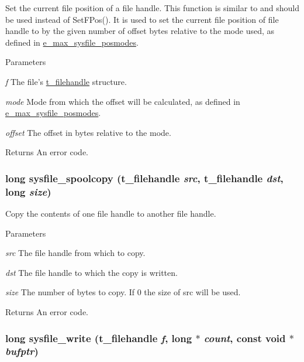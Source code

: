 Set the current file position of a file handle. This function is similar to and should be used instead of SetFPos(). It is used to set the current file position of file handle to by the given number of offset bytes relative to the mode used, as defined in \hyperlink{group__files_gaf61f48b912d9a2942d962ab5e61688fd}{e\_\-max\_\-sysfile\_\-posmodes}.


\begin{DoxyParams}{Parameters}
\item[{\em f}]The file's \hyperlink{group__files_gafcb776aa74d514754e83b30995b5a5d1}{t\_\-filehandle} structure. \item[{\em mode}]Mode from which the offset will be calculated, as defined in \hyperlink{group__files_gaf61f48b912d9a2942d962ab5e61688fd}{e\_\-max\_\-sysfile\_\-posmodes}. \item[{\em offset}]The offset in bytes relative to the mode. \end{DoxyParams}
\begin{DoxyReturn}{Returns}
An error code. 
\end{DoxyReturn}
\hypertarget{group__files_ga711ee8ebe5363e23e01d3ffeef67373e}{
\subsubsection[{sysfile\_\-spoolcopy}]{\setlength{\rightskip}{0pt plus 5cm}long sysfile\_\-spoolcopy ({\bf t\_\-filehandle} {\em src}, \/  {\bf t\_\-filehandle} {\em dst}, \/  long {\em size})}}
\label{group__files_ga711ee8ebe5363e23e01d3ffeef67373e}


Copy the contents of one file handle to another file handle. 
\begin{DoxyParams}{Parameters}
\item[{\em src}]The file handle from which to copy. \item[{\em dst}]The file handle to which the copy is written. \item[{\em size}]The number of bytes to copy. If 0 the size of src will be used. \end{DoxyParams}
\begin{DoxyReturn}{Returns}
An error code. 
\end{DoxyReturn}
\hypertarget{group__files_ga8272d55e223bfd31e96db15f73be8805}{
\subsubsection[{sysfile\_\-write}]{\setlength{\rightskip}{0pt plus 5cm}long sysfile\_\-write ({\bf t\_\-filehandle} {\em f}, \/  long $\ast$ {\em count}, \/  const void $\ast$ {\em bufptr})}}
\label{group__files_ga8272d55e223bfd31e96db15f73be8805}


